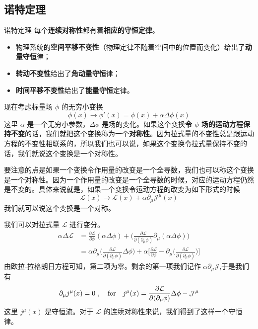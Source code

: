 \subsection{诺特定理}
\begin{theorem}{诺特定理}
每个\textbf{连续对称性}都有着\textbf{相应的守恒定律}。
\begin{itemize}
\item 物理系统的\textbf{空间平移不变性}（物理定律不随着空间中的位置而变化）给出了\textbf{动量守恒}律；
\item \textbf{转动不变性}给出了\textbf{角动量守恒}律；
\item \textbf{时间平移不变性}给出了\textbf{能量守恒}定律。
\end{itemize}
\end{theorem}
现在考虑标量场 $\phi$ 的无穷小变换
\begin{equation}
\phi(x) \rightarrow \phi'(x) = \phi(x) +\alpha \Delta \phi (x)
\end{equation}
这里 $\alpha$ 是一个无穷小参数，$\Delta \phi$ 是场的变化。如果这个变换\textbf{令 $\phi$ 场的运动方程保持不变}的话，我们就把这个变换称为一个\textbf{对称性}。因为拉式量的不变性总是跟运动方程的不变性相联系的，所以我们也可以说，如果这个变换令拉式量保持不变的话，我们就说这个变换是一个对称性。

要注意的点是如果一个变换令作用量的改变是一个全导数，我们也可以称这个变换是一个对称性。因为一个作用量的改变是一个全导数的时候，对应的运动方程仍然是不变的。具体来说就是，如果一个变换令运动方程的改变为如下形式的时候
\begin{equation}
\mathcal L(x) \rightarrow \mathcal L (x) +\alpha \partial_\mu \mathcal J^\mu (x)
\end{equation}
我们就可以说这个变换是一个对称。

我们可以对拉式量 $\mathcal L$ 进行变分。
\begin{align}\nonumber
\alpha \Delta \mathcal L & = \frac{\partial \mathcal L}{\partial \phi} (\alpha \Delta \phi) + \bigg( \frac{\partial \mathcal L}{\partial(\partial_\mu \phi)} \partial_\mu(\alpha \Delta \phi)\bigg) \\
& = \alpha \partial_\mu \bigg( \frac{\partial \mathcal L}{\partial (\partial_\mu\phi)} \Delta \phi \bigg) + \alpha \bigg[ \frac{\partial \mathcal L}{\partial \phi} - \partial_\mu \bigg( \frac{\partial \mathcal L}{\partial(\partial_\mu \phi)} \bigg) \bigg]
\end{align}
由欧拉-拉格朗日方程可知，第二项为零。剩余的第一项我们记作 $\alpha \partial_\mu \mathcal J$,于是我们有
\begin{equation}
\partial_\mu j^\mu(x) = 0~, \quad {\rm for}\quad j^\mu(x) = \frac{\partial \mathcal L}{\partial(\partial_\mu \phi)} \Delta \phi - \mathcal J^\mu
\end{equation}
这里 $j^\mu(x)$ 是守恒流。对于 $\mathcal L$ 的连续对称性来说，我们得到了这样一个守恒律。


